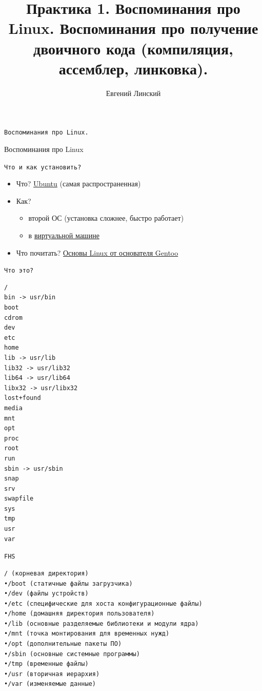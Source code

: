 \documentclass[pdf, 10pt, unicode]{beamer}
\title{Практика 1. Воспоминания про Linux. Воспоминания про получение двоичного кода (компиляция, ассемблер, линковка).}
\author{Евгений Линский}
\date{}
\begin{document}
\begin{frame}
  \vspace{1cm}
  \large
  \maketitle
  \thispagestyle{empty}
  \vspace{1cm}
  \date{}
\end{frame}


\begin{frame}[fragile]{{\tt Воспоминания про Linux.}}

\begin{center}
  \huge{Воспоминания про Linux}
\end{center}

\end{frame}

\begin{frame}[fragile]{{\tt Что и как установить?}}

  \begin{itemize}
      \item Что?  \href{https://ubuntu.com/download/desktop}{Ubuntu} (самая распространенная)
      \item Как?
        \begin{itemize}
            \item второй ОС (установка сложнее, быстро работает)
            \item в \href{https://ldvsoft.net/2017/09/10/ubuntu-course.html}{виртуальной машине}
        \end{itemize}
      \item Что почитать? \href{https://drive.google.com/file/d/14ZxbYY8FWMdCDnHH1NhKj98cBA7ZiODJ/view?usp=sharing}{Основы Linux от основателя Gentoo}
  \end{itemize}
\end{frame}


\begin{frame}[fragile]{{\tt Что это?}}
\begin{tiny}
\begin{verbatim}
/
bin -> usr/bin
boot
cdrom
dev
etc
home
lib -> usr/lib
lib32 -> usr/lib32
lib64 -> usr/lib64
libx32 -> usr/libx32
lost+found
media
mnt
opt
proc
root
run
sbin -> usr/sbin
snap
srv
swapfile
sys
tmp
usr
var
\end{verbatim}
\end{tiny}
\end{frame}

\begin{frame}[fragile]{{\tt FHS}}
\begin{verbatim}
/ (корневая директория)
•/boot (статичные файлы загрузчика)
•/dev (файлы устройств)
•/etc (специфические для хоста конфигурационные файлы)
•/home (домашняя директория пользователя)
•/lib (основные разделяемые библиотеки и модули ядра)
•/mnt (точка монтирования для временных нужд)
•/opt (дополнительные пакеты ПО)
•/sbin (основные системные программы)
•/tmp (временные файлы)
•/usr (вторичная иерархия)
•/var (изменяемые данные)
\end{verbatim}
\end{frame}
\end{document}
